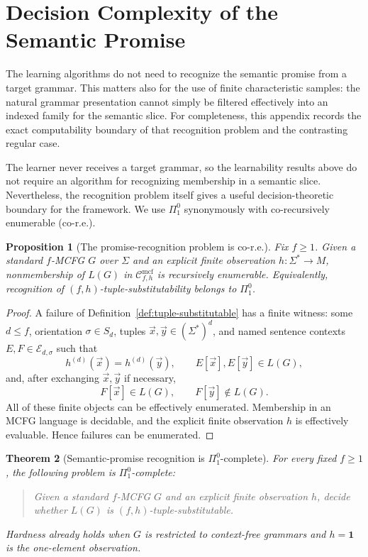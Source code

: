 \documentclass[11pt,a4paper]{article}
\numberwithin{equation}{section}
\theoremstyle{plain}
\newtheorem{theorem}{Theorem}[section]
\newtheorem{proposition}[theorem]{Proposition}
\theoremstyle{definition}
\theoremstyle{remark}
\newcommand{\Cmcf}[2]{\mathcal{C}^{\mathrm{mcf}}_{#1,#2}}
\newcommand{\tuple}[1]{\vec{#1}}
\begin{document}
\section{Decision Complexity of the Semantic Promise}
\label{app:decision-complexity}

The learning algorithms do not need to recognize the semantic promise from a
target grammar.  This matters also for the use of finite characteristic
samples: the natural grammar presentation cannot simply be filtered
effectively into an indexed family for the semantic slice.  For completeness,
this appendix records the exact computability boundary of that recognition
problem and the contrasting regular case.


The learner never receives a target grammar, so the learnability results above
do not require an algorithm for recognizing membership in a semantic slice.
Nevertheless, the recognition problem itself gives a useful decision-theoretic
boundary for the framework.  We use $\Pi^0_1$ synonymously with
co-recursively enumerable (co-r.e.).

\begin{proposition}[The promise-recognition problem is co-r.e.]
\label{prop:promise-pi1-upper}
Fix $f\ge1$.  Given a standard $f$-MCFG $G$ over $\Sigma$ and an explicit
finite observation $h:\Sigma^*\to M$, nonmembership of $L(G)$ in
$\Cmcf{f}{h}$ is recursively enumerable.  Equivalently, recognition of
$(f,h)$-tuple-substitutability belongs to $\Pi^0_1$.
\end{proposition}

\begin{proof}
A failure of Definition~\ref{def:tuple-substitutable} has a finite witness:
some $d\le f$, orientation $\sigma\in S_d$, tuples
$\tuple x,\tuple y\in(\Sigma^*)^d$, and named sentence contexts
$E,F\in\mathcal E_{d,\sigma}$ such that
\[
 h^{(d)}(\tuple x)=h^{(d)}(\tuple y),
 \qquad
 E[\tuple x],E[\tuple y]\in L(G),
\]
and, after exchanging $\tuple x,\tuple y$ if necessary,
\[
 F[\tuple x]\in L(G),
 \qquad
 F[\tuple y]\notin L(G).
\]
All of these finite objects can be effectively enumerated.  Membership in an
MCFG language is decidable, and the explicit finite observation $h$ is
effectively evaluable.  Hence failures can be enumerated.
\end{proof}

\begin{theorem}[Semantic-promise recognition is $\Pi^0_1$-complete]
\label{thm:promise-pi1-complete}
For every fixed $f\ge1$, the following problem is $\Pi^0_1$-complete:
\begin{quote}
Given a standard $f$-MCFG $G$ and an explicit finite observation $h$, decide
whether $L(G)$ is $(f,h)$-tuple-substitutable.
\end{quote}
Hardness already holds when $G$ is restricted to context-free grammars and
$h=\mathbf 1$ is the one-element observation.
\end{theorem}
\end{document}

